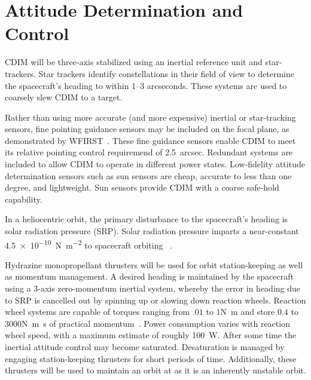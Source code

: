 \documentclass{ws-jai}
\begin{document}
\section{Attitude Determination and Control}
\label{sec:adcs}
CDIM will be three-axis stabilized using an inertial reference unit and star-trackers.
Star trackers identify constellations in their field of view to determine the spacecraft's heading to within 1--3 arcseconds.
These systems are used to coarsely slew CDIM to a target.

Rather than using more accurate (and more expensive) inertial or star-tracking sensors, fine pointing guidance sensors may be included on the focal plane, as demonstrated by WFIRST~\cite{wfirstFinal2012}.
These fine guidance sensors enable CDIM to meet its relative pointing control requiremend of \SI{2.5}{arcsec}.
Redundant systems are included to allow CDIM to operate in different power states.
Low-fidelity attitude determination sensors such as sun sensors are cheap, accurate to less than one degree, and lightweight.
Sun sensors provide CDIM with a coarse safe-hold capability.

In a heliocentric orbit, the primary disturbance to the spacecraft's heading is solar radiation pressure (SRP).
Solar radiation pressure imparts a near-constant \SI{4.5e-10}{\newton\per\meter\squared} to spacecraft orbiting \Ltwo~\cite{evans2002natural}.

Hydrazine monopropellant thrusters will be used for orbit station-keeping as well as momentum management.
A desired heading is maintained by the spacecraft using a 3-axis zero-momentum inertial system, whereby the error in heading due to SRP is cancelled out by spinning up or slowing down reaction wheels.
Reaction wheel systems are capable of torques ranging from $.01$ to $1$\si{\newton\meter} and store $0.4$ to $3000$\si{\newton\meter\second} of practical momentum~\cite{smad2015}.
Power consumption varies with reaction wheel speed, with a maximum estimate of roughly \SI{100}{\watt}.
After some time the inertial attitude control may become saturated.
Desaturation is managed by engaging station-keeping thrusters for short periods of time.
Additionally, these thrusters will be used to maintain an orbit at \Ltwo{} as it is an inherently unstable orbit.
\end{document}
